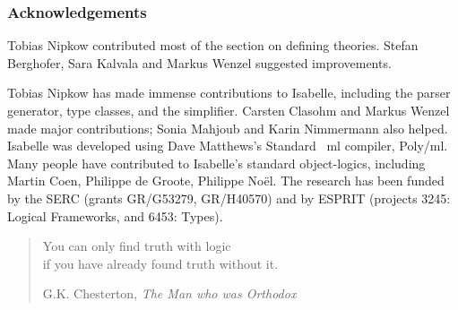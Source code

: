 \subsubsection*{Acknowledgements} 
Tobias Nipkow contributed most of the section on defining theories.
Stefan Berghofer, Sara Kalvala and Markus Wenzel suggested improvements.

Tobias Nipkow has made immense contributions to Isabelle, including the
parser generator, type classes, and the simplifier.  Carsten Clasohm and
Markus Wenzel made major contributions; Sonia Mahjoub and Karin Nimmermann
also helped.  Isabelle was developed using Dave Matthews's Standard~{\sc
  ml} compiler, Poly/{\sc ml}.  Many people have contributed to Isabelle's
standard object-logics, including Martin Coen, Philippe de Groote, Philippe
No\"el.  The research has been funded by the SERC (grants GR/G53279,
GR/H40570) and by ESPRIT (projects 3245: Logical Frameworks, and 6453:
Types).

\newpage
\pagestyle{plain} \tableofcontents 
\newpage

\vspace*{2.5cm}
\begin{quote}
\raggedleft
{\sanssi
You can only find truth with logic\\
if you have already found truth without it.}\\
\bigskip

G.K. Chesterton, {\em The Man who was Orthodox}
\end{quote}

\clearfirst  \pagestyle{headings}




 \small\raggedright\frenchspacing




